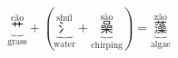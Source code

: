 \[ \underbrace{\overset{\text{cǎo}}{\text{艹}}}_{\text{grass}} + \left(\underbrace{\overset{\text{shuǐ}}{\text{氵}}}_{\text{water}} + \underbrace{\overset{\text{sào}}{\text{喿}}}_{\text{chirping}}\right) = \underbrace{\overset{\text{zǎo}}{\text{藻}}}_{\text{algae}} \]
